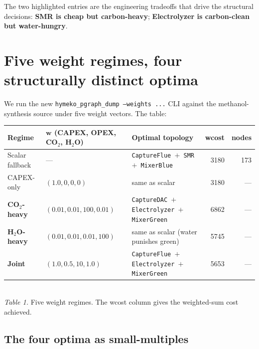 \documentclass[11pt,a4paper]{article}
\newcommand{\code}[1]{\texttt{\small #1}}
\begin{document}
The two highlighted entries are the engineering tradeoffs that drive
the structural decisions: \textbf{SMR is cheap but carbon-heavy};
\textbf{Electrolyzer is carbon-clean but water-hungry}.

\section{Five weight regimes, four structurally distinct optima}

We run the new \code{hymeko\_pgraph\_dump --weights ...} CLI against
the methanol-synthesis source under five weight vectors. The table:

\begin{center}\small
\begin{tabular}{lll r r}
\toprule
Regime & $\boldsymbol{w}$ (CAPEX, OPEX, CO$_2$, H$_2$O) & Optimal topology & wcost & nodes \\
\midrule
Scalar fallback     & ---                          & \texttt{CaptureFlue $+$ SMR $+$ MixerBlue} & 3180 & 173 \\
CAPEX-only          & $(1.0, 0, 0, 0)$             & same as scalar                            & 3180 & --- \\
\textbf{CO$_2$-heavy} & $(0.01, 0.01, 100, 0.01)$ & \texttt{CaptureDAC $+$ Electrolyzer $+$ MixerGreen} & 6862 & --- \\
\textbf{H$_2$O-heavy} & $(0.01, 0.01, 0.01, 100)$ & same as scalar (water punishes green)     & 5745 & --- \\
\textbf{Joint}      & $(1.0, 0.5, 10, 1.0)$        & \texttt{CaptureFlue $+$ Electrolyzer $+$ MixerGreen} & 5653 & --- \\
\bottomrule
\end{tabular}\\[3pt]
\small\textit{Table 1.} Five weight regimes. The wcost column gives the
weighted-sum cost achieved.
\end{center}

\subsection{The four optima as small-multiples}
\end{document}
